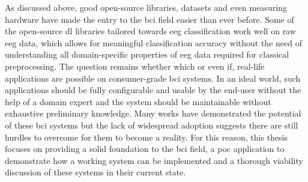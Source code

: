 As discussed above, good open-source libraries, datasets and even measuring hardware have made the entry to the \gls{bci} field easier than ever before.
Some of the open-source \gls{dl} libraries tailored towards \gls{eeg} classification work well on raw \gls{eeg} data, which allows for meaningful classification accuracy without the need of understanding all domain-specific properties of \gls{eeg} data required for classical preprocessing.
The question remains whether which or even if, real-life applications are possible on consumer-grade \gls{bci} systems.
In an ideal world, such applications should be fully configurable and usable by the end-user without the help of a domain expert and the system should be maintainable without exhaustive preliminary knowledge. 
Many works have demonstrated the potential of these \gls{bci} systems but the lack of widespread adoption suggests there are still hurdles to overcome for them to become a reality.
For this reason, this thesis focuses on providing a solid foundation to the \gls{bci} field, a \gls{poc} application to demonstrate how a working system can be implemented and a thorough viability discussion of these systems in their current state.

